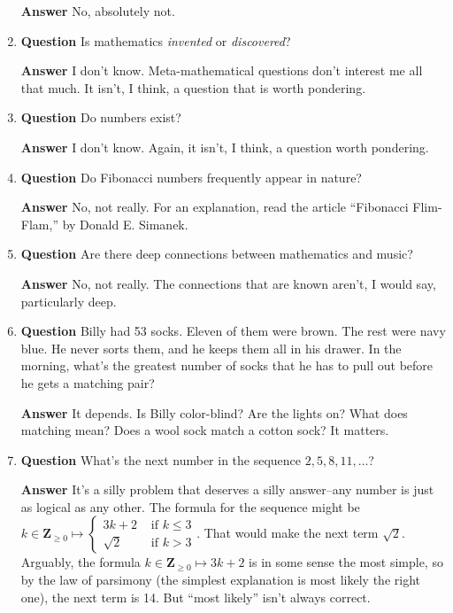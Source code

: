 \documentclass[11pt]{article}
\newcounter{ex}\setcounter{ex}{0}
\begin{document}
\begin{enumerate}
\textbf{Answer} No, absolutely not.

\item  \textbf{Question}  Is mathematics \emph{invented} or \emph{discovered}?

 \textbf{Answer} I don't know. Meta-mathematical questions don't interest me all that much. 
It isn't, I think, a question that is worth pondering.

\item  \textbf{Question} Do numbers exist?

  \textbf{Answer} I don't know. Again, it isn't, I think, a question worth pondering.

\item  \textbf{Question} Do Fibonacci numbers frequently appear in nature?

\textbf{Answer}  No, not really.  For an explanation, read the article ``Fibonacci Flim-Flam,'' by Donald E. Simanek.

\item  \textbf{Question} Are there deep connections between mathematics and music? 

  \textbf{Answer}  No, not really. The connections that are known aren't, I would say, particularly deep.

\item  \textbf{Question}  Billy had 53 socks.  Eleven of them were brown.  The rest were navy blue.  He never sorts them, and he keeps them all in his drawer.  In the morning, what's the greatest number of socks that he has to pull out before he gets a matching pair?

  \textbf{Answer} It depends. Is Billy color-blind?  Are the lights on? What does matching mean? Does a wool sock match a cotton sock? It matters.

\item  \textbf{Question} What's the next number in the sequence  \(2,5,8,11, \dots \)?

  \textbf{Answer}  It's a silly problem that deserves a silly answer--any number is just as logical as any other. 
The formula for the sequence might be \(k \in \mathbf{Z}_{\geq 0} \mapsto \begin{cases} 3 k +2 & \mbox{ if } k \leq 3
 \\ \sqrt{2} & \mbox{ if } k >  3 \end{cases} \). That would make the next term \(\sqrt{2} \). 
 Arguably, the formula  \(k \in \mathbf{Z}_{\geq 0}  \mapsto 3 k +2 \) is in some 
 sense the most simple, so by the law of parsimony 
 (the simplest explanation is most likely the right one), the next 
 term is 14. But ``most likely'' isn't always correct.


\end{enumerate}
\end{document}

